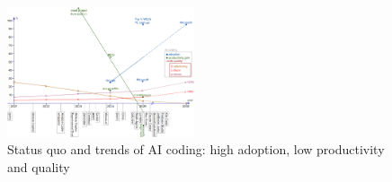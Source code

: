 \documentclass[twocolumn,german]{article}
\begin{document}
\begin{figure}[hbt!]
  \vspace{-4mm}
  \hspace{-3mm}
  \includegraphics[width=0.49\textwidth]{figures/allStats_v4}
  \vspace{-7mm}
\caption{Status quo and trends of AI coding: high adoption, low productivity and quality}
\label{fig:statusquo}
\end{figure}
\end{document}
